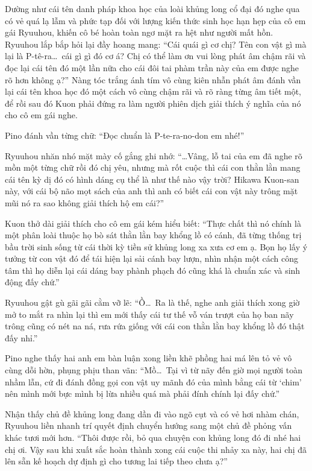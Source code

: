 \documentclass[../main.tex]{subfiles}
\begin{document}
Dường như cái tên danh pháp khoa học của loài khủng long cổ đại đó nghe qua có vẻ quá lạ lẫm và phức tạp đối với lượng kiến thức sinh học hạn hẹp của cô em gái Ryuuhou, khiến cô bé hoàn toàn ngơ mặt ra hệt như người mất hồn. Ryuuhou lắp bắp hỏi lại đầy hoang mang: ``Cái quái gì cơ chị? Tên con vật gì mà lại là P-tê-ra\dots\ cái gì gì đó cơ á? Chị có thể làm ơn vui lòng phát âm chậm rãi và đọc lại cái tên đó một lần nữa cho cái đôi tai phàm trần này của em được nghe rõ hơn không ạ?'' Nàng tóc trắng ánh tím vô cùng kiên nhẫn phát âm đánh vần lại cái tên khoa học đó một cách vô cùng chậm rãi và rõ ràng từng âm tiết một, để rồi sau đó Kuon phải đứng ra làm người phiên dịch giải thích ý nghĩa của nó cho cô em gái nghe.

Pino đánh vần từng chữ: ``Đọc chuẩn là P-te-ra-no-don em nhé!''

Ryuuhou nhăn nhó mặt mày cố gắng ghi nhớ: ``\dots Vâng, lỗ tai của em đã nghe rõ mồn một từng chữ rồi đó chị yêu, nhưng mà rốt cuộc thì cái con thằn lằn mang cái tên kỳ dị đó có hình dáng cụ thể là như thế nào vậy trời? Hikawa Kuon-san này, với cái bộ não mọt sách của anh thì anh có biết cái con vật này trông mặt mũi nó ra sao không giải thích hộ em cái?''

Kuon thở dài giải thích cho cô em gái kém hiểu biết: ``Thực chất thì nó chính là một phân loài thuộc họ bò sát thằn lằn bay khổng lồ có cánh, đã từng thống trị bầu trời sinh sống từ cái thời kỳ tiền sử khủng long xa xưa cơ em ạ. Bọn họ lấy ý tưởng từ con vật đó để tái hiện lại sải cánh bay lượn, nhìn nhận một cách công tâm thì họ diễn lại cái dáng bay phành phạch đó cũng khá là chuẩn xác và sinh động đấy chứ.''

Ryuuhou gật gù gãi gãi cằm vỡ lẽ: ``Ồ\dots\ Ra là thế, nghe anh giải thích xong giờ mở to mắt ra nhìn lại thì em mới thấy cái tư thế vỗ ván trượt của họ ban nãy trông cũng có nét na ná, rưa rứa giống với cái con thằn lằn bay khổng lồ đó thật đấy nhỉ.''

Pino nghe thấy hai anh em bàn luận xong liền khẽ phồng hai má lên tỏ vẻ vô cùng dỗi hờn, phụng phịu than vãn: ``Mồ\dots\ Tại vì từ nãy đến giờ mọi người toàn nhầm lẫn, cứ đi đánh đồng gọi con vật uy mãnh đó của mình bằng cái từ `chim' nên mình mới bực mình bị lừa nhiều quá mà phải đính chính lại đấy chứ.''

Nhận thấy chủ đề khủng long đang dần đi vào ngõ cụt và có vẻ hơi nhàm chán, Ryuuhou liền nhanh trí quyết định chuyển hướng sang một chủ đề phỏng vấn khác tươi mới hơn. ``Thôi được rồi, bỏ qua chuyện con khủng long đó đi nhé hai chị ơi. Vậy sau khi xuất sắc hoàn thành xong cái cuộc thi nhảy xa này, hai chị đã lên sẵn kế hoạch dự định gì cho tương lai tiếp theo chưa ạ?''
\end{document}
